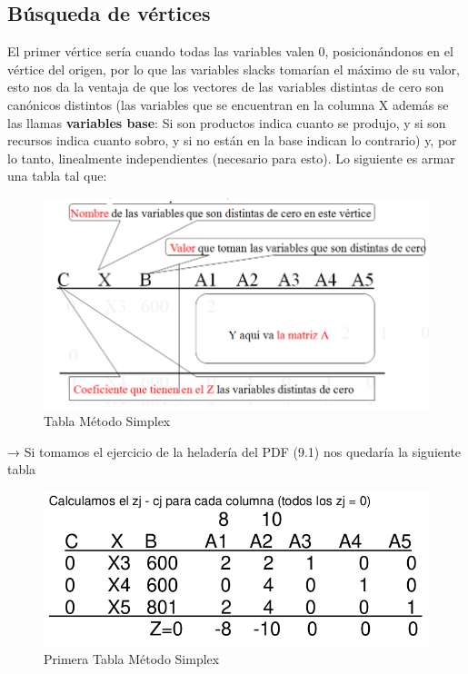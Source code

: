 \documentclass[titlepage,a4paper]{article}
\begin{document}
 
\subsection{Búsqueda de vértices}


El primer vértice sería cuando todas las variables valen 0, posicionándonos en el vértice del origen, por lo que las variables slacks tomarían el máximo de su valor, esto nos da la ventaja de que los vectores de las variables distintas de cero son canónicos distintos (las variables que se encuentran en la columna X además se las llamas \textbf{variables base}: Si son productos indica cuanto se produjo, y si son recursos indica cuanto sobro, y si no están en la base indican lo contrario) y, por lo tanto, linealmente independientes (necesario para esto).
Lo siguiente es armar una tabla tal que:

\begin{figure}[H]
    \centering
    \includegraphics[scale=0.5]{tabla_simplex.png}
    \caption{Tabla Método Simplex}
\end{figure}


→ Si tomamos el ejercicio de la heladería del PDF (9.1) nos quedaría la siguiente tabla

\begin{figure}[H]
    \centering
    \includegraphics[scale=0.5]{primera_tabla_simplex.png}
    \caption{Primera Tabla Método Simplex}
\end{figure}
\end{document}
